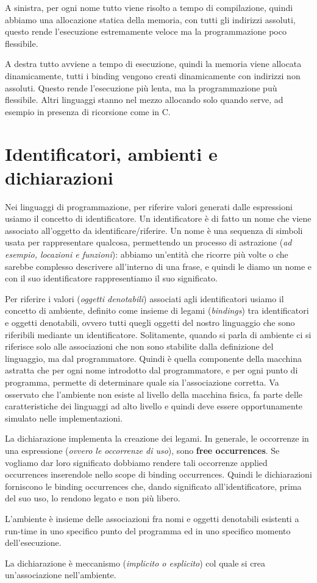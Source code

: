 \documentclass[oneside,a4paper,11pt]{book}
\theoremstyle{italicstyle}
\theoremstyle{normStyle}
\begin{document}
A sinistra, per ogni nome tutto viene risolto a tempo di
compilazione, quindi abbiamo una allocazione statica della memoria, 
con tutti gli indirizzi assoluti, questo rende l'esecuzione estremamente 
veloce ma la programmazione poco flessibile.

A destra tutto avviene a tempo di esecuzione, quindi la memoria 
viene allocata dinamicamente, tutti i binding vengono creati dinamicamente con indirizzi 
non assoluti.
Questo rende l'esecuzione più lenta, ma la programmazione puù flessibile.
Altri linguaggi stanno nel mezzo allocando solo quando serve, ad esempio in presenza 
di ricorsione come in C.
\section{Identificatori, ambienti e dichiarazioni}
Nei linguaggi di programmazione, per riferire valori generati dalle espressioni
usiamo il concetto di identificatore. Un identificatore è di
fatto un nome che viene associato all’oggetto da identificare/riferire.
Un nome è una sequenza di simboli usata per rappresentare qualcosa,
permettendo un processo di astrazione (\textit{ad esempio, locazioni e
funzioni}): abbiamo un’entità che ricorre più volte o che sarebbe
complesso descrivere all’interno di una frase, e quindi le diamo
un nome e con il suo identificatore rappresentiamo il suo significato.

Per riferire i valori (\textit{oggetti denotabili}) associati agli identificatori
usiamo il concetto di ambiente, definito come insieme di legami (\textit{bindings})
tra identificatori e oggetti denotabili, ovvero tutti quegli oggetti
del nostro linguaggio che sono riferibili mediante un identificatore.
Solitamente, quando si parla di ambiente ci si riferisce solo alle associazioni
che non sono stabilite dalla definizione del linguaggio, ma dal programmatore.
Quindi è quella componente della macchina astratta che per ogni nome
introdotto dal programmatore, e per ogni punto di programma, permette
di determinare quale sia l’associazione corretta. Va osservato che l’ambiente non esiste al livello della macchina fisica, fa parte delle caratteristiche dei linguaggi ad alto livello e quindi deve essere opportunamente simulato nelle implementazioni.

La dichiarazione implementa la creazione dei legami. In
generale, le occorrenze in una espressione (\textit{ovvero le
occorrenze di uso}), sono \textbf{free occurrences}. Se vogliamo dar loro significato dobbiamo rendere tali occorrenze
applied occurrences inserendole nello scope di binding occurrences. Quindi le dichiarazioni forniscono le binding
occurrences che, dando significato all’identificatore, prima del suo
uso, lo rendono legato e non più libero.
\begin{tcolorbox}[title = {Ambiente}]
  L'ambiente è insieme delle associazioni fra nomi e oggetti denotabili esistenti a
  run-time in uno specifico punto del programma ed in uno specifico momento
  dell’esecuzione.
\end{tcolorbox}
\begin{tcolorbox}[title = {Dichiarazione}]
  La dichiarazione è meccanismo (\textit{implicito o esplicito}) col quale si crea un’associazione nell’ambiente.
\end{tcolorbox}
\end{document}
